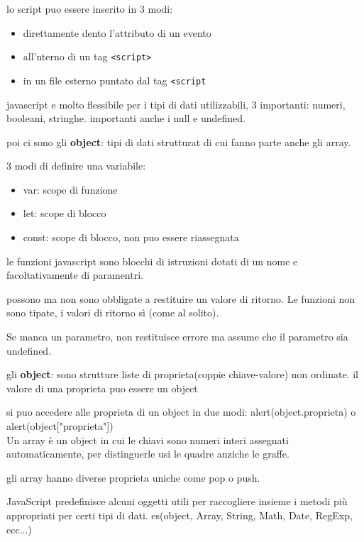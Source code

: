 \documentclass[12pt]{article}
\begin{document}
lo script puo essere inserito in 3 modi:
\begin{itemize}
    \item direttamente dento l'attributo di un evento
    \item all'nterno di un tag \texttt{<script>}
    \item in un file esterno puntato dal tag \texttt{<script}
    \end{itemize}

    javascript e molto flessibile per i tipi di dati utilizzabili, 3 importanti:
    numeri, booleani, stringhe. importanti anche i null e undefined.

    poi ci sono gli \textbf{object}: tipi di dati strutturat di cui fanno parte anche gli array.

    3 modi di definire una variabile:
    \begin{itemize}
        \item var: scope di funzione
        \item let: scope di blocco
        \item const: scope di blocco, non puo essere riassegnata
        \end{itemize}

        le funzioni javascript sono blocchi di istruzioni dotati di un nome e facoltativamente di paramentri.

possono ma non sono obbligate a restituire un valore di ritorno. Le
funzioni non sono tipate, i valori di ritorno sì (come al solito).

Se manca un parametro, non restituisce errore ma assume che il parametro
sia undefined.

gli \textbf{object}: sono strutture liste di proprieta(coppie chiave-valore) non ordinate.
il valore di una proprieta puo essere un object

si puo accedere alle proprieta di un object in due modi:
alert(object.proprieta) o alert(object["proprieta"])\\

Un array è un object in cui le chiavi sono numeri interi assegnati
automaticamente, per distinguerle usi le quadre anziche le graffe.

gli array hanno diverse proprieta uniche come pop o push.

JavaScript predefinisce alcuni oggetti utili per raccogliere
insieme i metodi più appropriati per certi tipi di dati.
es(object, Array, String, Math, Date, RegExp, ecc...)\\
\end{document}
